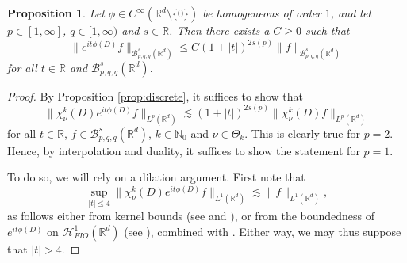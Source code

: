 \documentclass{amsart}
\newtheorem{proposition}[theorem]{Proposition}
\theoremstyle{definition}
\newcommand{\R}{\mathbb{R}}
\newcommand{\N}{\mathbb{N}}
\newcommand {\Rd}{\mathbb{R}^{d}}
\newcommand {\HT}{\mathcal{H}}
\newcommand {\Baspqq}{\mathcal{B}^{s}_{p,q,q}(\Rd)}
\newcommand {\supp}{\mathrm{supp}}
\numberwithin{equation}{section}
\begin{document}
\begin{proposition}
\label{prop:PolynomialGrowth}
Let $\phi\in C^{\infty}(\Rd\setminus\{0\})$ be homogeneous of order $1$, and let $p\in[1,\infty]$, $q\in[1,\infty)$ and $s\in\R$. Then there exists a $C\geq0$ such that
\[
\| e^{it \phi(D)} f \|_{\Baspqq} \leq C (1+|t|)^{2s(p)} \| f \|_{\Baspqq}
\]
for all $t\in\R$ and $\Baspqq$.
\end{proposition}
\begin{proof}
By Proposition \ref{prop:discrete}, it suffices to show that 
\[
\|\chi_{\nu}^{k}(D)e^{it\phi(D)}f\|_{L^{p}(\Rd)}\lesssim (1+|t|)^{2s(p)}\|\chi_{\nu}^{k}(D)f\|_{L^{p}(\Rd)}
\]
for all $t\in\R$, $f\in\Baspqq$, $k\in\N_{0}$ and $\nu\in\Theta_{k}$. This is clearly true for $p=2$. Hence, by interpolation and duality, it suffices to show the statement for $p=1$. 

To do so, we will rely on a dilation argument. First note that 
\begin{equation}\label{eq:L1fixed}
\sup_{|t|\leq 4}\|\chi_{\nu}^{k}(D)e^{it\phi(D)}f\|_{L^{1}(\Rd)}\lesssim \|f\|_{L^{1}(\Rd)},
\end{equation}
as follows either from kernel bounds (see \cite[p.~406]{Stein93} and \cite[Remark 3.7]{Rozendaal2021}), or from the boundedness of $e^{it\phi(D)}$ on $\HT^{1}_{FIO}(\Rd)$ (see \cite[Corollary 3.6]{Rozendaal2021LocalSmoothing}), combined with \cite[Proposition 6.4]{FaLiRoSo19}. Either way, we may thus suppose that $|t|> 4$. %


\end{proof}
\end{document}

